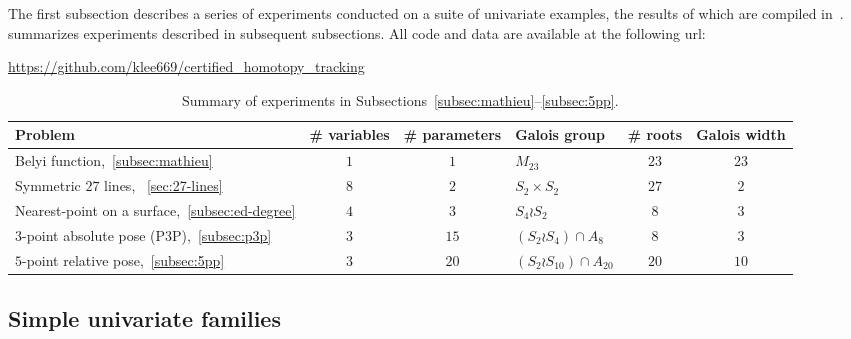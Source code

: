 \documentclass[11pt]{amsart}
\theoremstyle{definition}
\theoremstyle{remark}
\begin{document}
The first subsection describes a series of experiments conducted on a suite of univariate examples, the results of which are compiled in~.
 summarizes experiments described in subsequent subsections.
All code and data are available at the following url:

\begin{center}
\url{https://github.com/klee669/certified_homotopy_tracking}
\end{center}

\begin{table}[t]
    \centering
    \small
\begin{tabular}{l c c l c c}
    \toprule
    Problem & \# variables & \# parameters & Galois group & \# roots & Galois width \\
    \midrule
    Belyi function,~\ref{subsec:mathieu} & $1$ & $1$ & $M_{23}$ & $23$ & $23$ \\
    Symmetric $27$ lines, ~\ref{sec:27-lines} & $8$ & $2$ & $S_2 \times S_2$ & $27$ & $2$ \\
    Nearest-point on a surface,~\ref{subsec:ed-degree} & $4$ & $3$ & $S_4 \wr S_2$ & $8$ & $3$ \\
    3-point absolute pose (P3P),~\ref{subsec:p3p} & $3$ & $15$ & $(S_2 \wr S_4) \cap A_8$ & $8$ & $3$ \\
    $5$-point relative pose,~\ref{subsec:5pp} & $3$ & $20$ & $(S_2 \wr S_{10}) \cap A_{20}$ & $20$ & $10$ \\
    \bottomrule
\end{tabular}

\caption{Summary of experiments in Subsections~\ref{subsec:mathieu}--\ref{subsec:5pp}.}
\label{tab:results} \end{table}


\subsection{Simple univariate families}\label{subsec:univariate}
\end{document}
